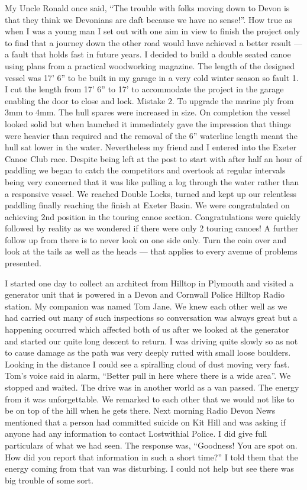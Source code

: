 My Uncle Ronald once said, ``The trouble with folks moving down to Devon is that
they think we Devonians are daft because we have no sense!''. How true as when
I was a young man I set out with one aim in view to finish the project only to
find that a journey down the other road would have achieved a better result ---
a fault that holds fast in future years. I decided to build a double seated
canoe using plans from a practical woodworking magazine. The length of the
designed vessel was 17' 6'' to be built in my garage in a very cold winter
season so fault 1. I cut the length from 17' 6'' to 17' to accommodate the
project in the garage enabling the door to close and lock. Mistake 2. To
upgrade the marine ply from 3mm to 4mm. The hull spares were increased in size.
On completion the vessel looked solid but when launched it immediately gave the
impression that things were heavier than required and the removal of the 6''
waterline length meant the hull sat lower in the water. Nevertheless my friend
and I entered into the Exeter Canoe Club race. Despite being left at the post
to start with after half an hour of paddling we began to catch the competitors
and overtook at regular intervals being very concerned that it was like pulling
a log through the water rather than a responsive vessel. We reached Double
Locks, turned and kept up our relentless paddling finally reaching the finish
at Exeter Basin. We were congratulated on achieving 2nd position in the touring
canoe section. Congratulations were quickly followed by reality as we wondered
if there were only 2 touring canoes! A further follow up from there is to never
look on one side only. Turn the coin over and look at the tails as well as the
heads --- that applies to every avenue of problems presented.

I started one day to collect an architect from Hilltop in Plymouth and visited a
generator unit that is powered in a Devon and Cornwall Police Hilltop Radio
station. My companion was named Tom Jane.   We knew each other well as we had
carried out many of such inspections so conversation was always great but a
happening occurred which affected both of us after we looked at the generator
and started our quite long descent to return. I was driving quite slowly so as
not to cause damage as the path was very deeply rutted with small loose
boulders. Looking in the distance I could see a spiralling cloud of dust moving
very fast. Tom's voice said in alarm, ``Better pull in here where there is a
wide area''. We stopped and waited. The drive was in another world as a van
passed. The energy from it was unforgettable. We remarked to each other that we
would not like to be on top of the hill when he gets there. Next morning Radio
Devon News mentioned that a person had committed suicide on Kit Hill and was
asking if anyone had any information to contact Lostwithial Police. I did give
full particulars of what we had seen. The response was, ``Goodness! You are
spot on. How did you report that information in such a short time?'' I told
them that the energy coming from that van was disturbing. I could not help but
see there was big trouble of some sort.


